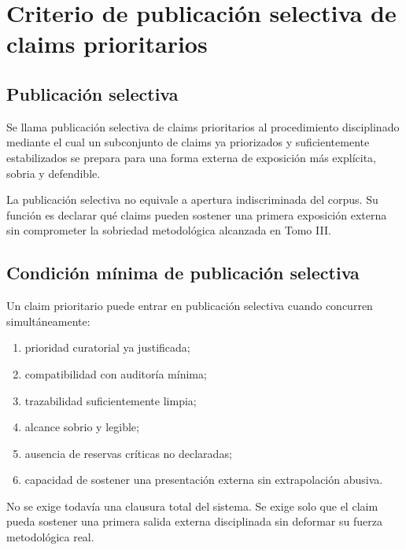 \chapter{Criterio de publicación selectiva de claims prioritarios}

\section{Publicación selectiva}
\begin{definition}
Se llama publicación selectiva de claims prioritarios al procedimiento disciplinado mediante el cual un subconjunto de claims ya priorizados y suficientemente estabilizados se prepara para una forma externa de exposición más explícita, sobria y defendible.
\end{definition}

\begin{observation}
La publicación selectiva no equivale a apertura indiscriminada del corpus. Su función es declarar qué claims pueden sostener una primera exposición externa sin comprometer la sobriedad metodológica alcanzada en Tomo III.
\end{observation}

\section{Condición mínima de publicación selectiva}
\begin{definition}
Un claim prioritario puede entrar en publicación selectiva cuando concurren simultáneamente:
\begin{enumerate}
  \item prioridad curatorial ya justificada;
  \item compatibilidad con auditoría mínima;
  \item trazabilidad suficientemente limpia;
  \item alcance sobrio y legible;
  \item ausencia de reservas críticas no declaradas;
  \item capacidad de sostener una presentación externa sin extrapolación abusiva.
\end{enumerate}
\end{definition}

\begin{observation}
No se exige todavía una clausura total del sistema. Se exige solo que el claim pueda sostener una primera salida externa disciplinada sin deformar su fuerza metodológica real.
\end{observation}

